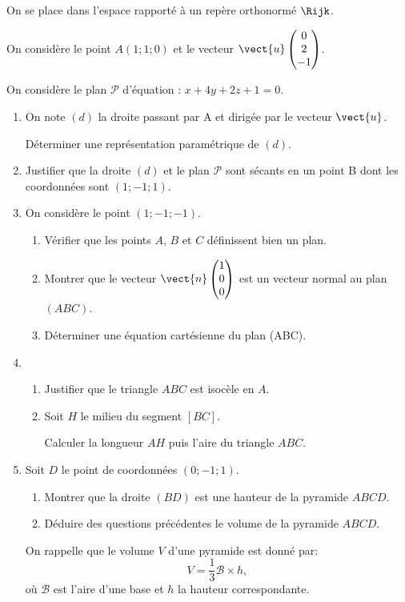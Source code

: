 On se place dans l'espace rapporté à un repère orthonormé $\Rijk$.

On considère le point $A(1;1;0)$ et le vecteur $\vect{u}\begin{pmatrix}0\\2\\- 1\end{pmatrix}$.

On considère le plan $\mathcal{P}$ d'équation : $x + 4y + 2z + 1 = 0$.

\begin{enumerate}
	\item On note $(d)$ la droite passant par A et dirigée par le vecteur $\vect{u}$.
	
	Déterminer une représentation paramétrique de $(d)$.
	\item Justifier que la droite $(d)$ et le plan $\mathcal{P}$ sont sécants en un point B dont les coordonnées sont $(1;-1;1)$.
	\item On considère le point $(1;-1;-1)$.
	\begin{enumerate}
		\item Vérifier que les points $A$, $B$ et $C$ définissent bien un plan.
		\item Montrer que le vecteur $\vect{n}\begin{pmatrix}1\\0\\0\end{pmatrix}$ est un vecteur normal au plan $(ABC)$.
		\item Déterminer une équation cartésienne du plan (ABC).
	\end{enumerate}
	\item 
	\begin{enumerate}
		\item Justifier que le triangle $ABC$ est isocèle en $A$.
		\item Soit $H$ le milieu du segment $[BC]$.
		
		Calculer la longueur $AH$ puis l'aire du triangle $ABC$.
	\end{enumerate}
	\item Soit $D$ le point de coordonnées $(0;-1;1)$.
	\begin{enumerate}
		\item Montrer que la droite $(BD)$ est une hauteur de la pyramide $ABCD$.
		\item Déduire des questions précédentes le volume de la pyramide $ABCD$.
	\end{enumerate}
	\hfill On rappelle que le volume $V$ d'une pyramide est donné par: \[V = \dfrac13 \mathcal{B} \times h,\] où $\mathcal{B}$ est l'aire d'une base et $h$ la hauteur correspondante.\hfill~
\end{enumerate}
